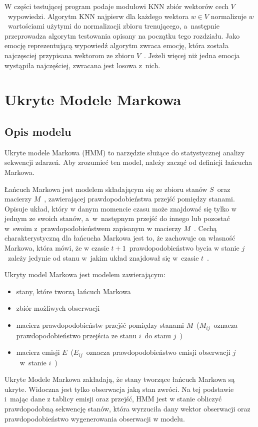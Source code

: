 \documentclass[declaration,shortabstract]{iithesis}
\begin{document}
W części testującej program podaje modułowi KNN zbiór wektorów cech $V$~wypowiedzi. Algorytm KNN najpierw dla każdego wektora $w \in V$ normalizuje $w$~wartościami użytymi do normalizacji zbioru trenującego, a~następnie przeprowadza algorytm testowania opisany na początku tego rozdziału. Jako emocję reprezentującą wypowiedź algorytm zwraca emocję, która została najczęsciej przypisana wektorom ze zbioru $V$~. Jeżeli więcej niż jedna emocja wystąpiła najczęściej, zwracana jest losowa z~nich.  

\chapter{Ukryte Modele Markowa}
\section{Opis modelu}
Ukryte modele Markowa (HMM) to narzędzie służące do statystycznej analizy sekwencji zdarzeń. Aby zrozumieć ten model, należy zacząć od 
definicji łańcucha Markowa.

Łańcuch Markowa jest modelem składającym się ze zbioru stanów $S$~oraz macierzy $M$~, zawierającej prawdopodobieństwa przejść pomiędzy stanami. Opisuje układ, który w danym momencie czasu może znajdować się tylko w jednym ze swoich stanów, a~w~następnym przejść do innego lub pozostać w~swoim z~prawdopodobieństwem zapisanym w macierzy $M$~. Cechą charakterystyczną dla łańcucha Markowa jest to, że zachowuje on własność Markowa, która mówi, że w czasie $t+1$~prawdopodobieństwo bycia w stanie $j$~zależy jedynie od stanu w~jakim układ znajdował się w~czasie $t$~.

Ukryty model Markowa jest modelem zawierającym:
\begin{itemize}
\item stany, które tworzą łańcuch Markowa
\item zbiór możliwych obserwacji
\item macierz prawdopodobieństw przejść pomiędzy stanami $M$~($M_{ij}$~oznacza prawdopodobieństwo przejścia ze stanu $i$~do stanu $j$~)
\item macierz emisji $E$~($E_{ij}$~oznacza prawdopodobieństwo emisji obserwacji $j$~w~stanie $i$~)
\end{itemize}

Ukryte Modele Markowa zakładają, że stany tworzące łańcuch Markowa są ukryte. Widoczna jest tylko obserwacja jaką stan zwróci. Na tej podstawie i~mając dane z tablicy emisji oraz przejść, HMM jest w stanie obliczyć prawdopodobną sekwencję stanów, która wyrzuciła dany wektor obserwacji oraz prawdopodobieństwo wygenerowania obserwacji w modelu.
\end{document}
